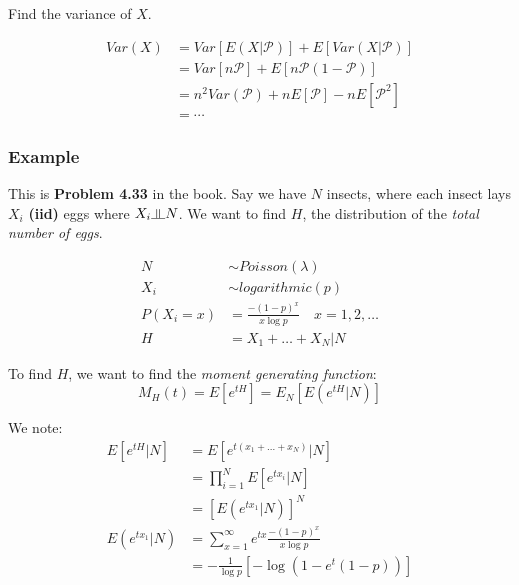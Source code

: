 \documentclass{article}
\newcommand{\indep}{\rotatebox[origin=c]{90}{$\models$}}
\begin{document}
Find the variance of $X$.

\begin{equation*}
    \begin{split}
        Var(X) &= Var[E(X|\mathcal{P})] + E[Var(X|\mathcal{P})]\\
        &= Var[n\mathcal{P}] + E[n\mathcal{P}(1-\mathcal{P})]\\
        &= n^2 Var(\mathcal{P}) + n E[\mathcal{P}] - nE[\mathcal{P}^2]\\
        &= \cdots
    \end{split}
\end{equation*}


\subsubsection*{Example}

This is \textbf{Problem 4.33} in the book. Say we have $N$ insects, where each insect lays $X_i$ \textbf{(iid)} eggs where $X_i \indep N$. We want to find $H$, the distribution of the \textit{total number of eggs}.

\begin{equation*}
    \begin{split}
        N &\sim Poisson(\lambda)\\
        X_i &\sim logarithmic(p)\\
        P(X_i=x) &= \frac{-(1-p)^x}{x\log p} \quad x = 1,2,\dots\\
        H &= X_1 + \dots + X_N | N
    \end{split}
\end{equation*}

To find $H$, we want to find the \textit{moment generating function}:
\begin{equation*}
     M_H(t) = E[e^{tH}] = E_N[E(e^{tH}|N)]
\end{equation*}

We note:
\begin{equation*}
    \begin{split}
        E[e^{tH}|N] &= E[e^{t(x_1+...+x_N)}|N]\\
                    &= \prod_{i=1}^N E[e^{tx_i}|N]\\
                    &= [E(e^{tx_1}|N)]^N\\
                E(e^{tx_1}|N) &= \sum_{x=1}^\infty e^{tx} \frac{-(1-p)^x}{x\log p}\\
                        &= -\frac{1}{\log p }\left[-\log \left(1-e^t(1-p) \right)\right]
    \end{split}
\end{equation*}
\end{document}
